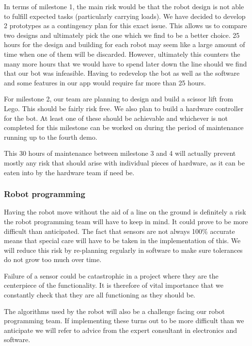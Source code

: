 \documentclass{article}
\begin{document}
In terms of milestone 1, the main risk would be that the robot design is not able to fulfill expected tasks (particularly carrying loads). We have decided to develop 2 prototypes as a contingency plan for this exact issue. This allows us to compare two designs and ultimately pick the one which we find to be a better choice. 25 hours for the design and building for each robot may seem like a large amount of time when one of them will be discarded. However, ultimately this counters the many more hours that we would have to spend later down the line should we find that our bot was infeasible. Having to redevelop the bot as well as the software and some features in our app would require far more than 25 hours.

For milestone 2, our team are planning to design and build a scissor lift from Lego. This should be fairly risk free. We also plan to build a hardware controller for the bot. At least one of these should be achievable and whichever is not completed for this milestone can be worked on during the period of maintenance running up to the fourth demo.

This 30 hours of maintenance between milestone 3 and 4 will actually prevent mostly any risk that should arise with individual pieces of hardware, as it can be eaten into by the hardware team if need be.

\subsubsection{Robot programming}

Having the robot move without the aid of a line on the ground is definitely a risk the robot programming team will have to keep in mind. It could prove to be more difficult than anticipated. The fact that sensors are not always 100\% accurate means that special care will have to be taken in the implementation of this. We will reduce this risk by re-planning regularly in software to make sure tolerances do not grow too much over time. 

Failure of a sensor could be catastrophic in a project where they are the centerpiece of the functionality. It is therefore of vital importance that we constantly check that they are all functioning as they should be.

The algorithms used by the robot will also be a challenge facing our robot programming team. If implementing these turns out to be more difficult than we anticipate we will refer to advice from the expert consultant in electronics and software.
\end{document}
